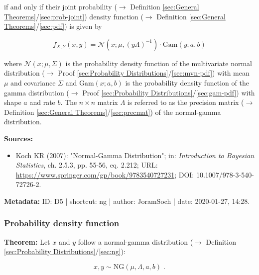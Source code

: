 \documentclass[a4paper,12pt,twoside]{book}
\begin{document}
if and only if their joint probability ($\rightarrow$ Definition \ref{sec:General Theorems}/\ref{sec:prob-joint}) density function ($\rightarrow$ Definition \ref{sec:General Theorems}/\ref{sec:pdf}) is given by

\begin{equation} \label{eq:ng-ng-pdf}
f_{X,Y}(x,y) = \mathcal{N}(x; \mu, (y \Lambda)^{-1}) \cdot \mathrm{Gam}(y; a, b)
\end{equation}

where $\mathcal{N}(x; \mu, \Sigma)$ is the probability density function of the multivariate normal distribution ($\rightarrow$ Proof \ref{sec:Probability Distributions}/\ref{sec:mvn-pdf}) with mean $\mu$ and covariance $\Sigma$ and $\mathrm{Gam}(x; a, b)$ is the probability density function of the gamma distribution ($\rightarrow$ Proof \ref{sec:Probability Distributions}/\ref{sec:gam-pdf}) with shape $a$ and rate $b$. The $n \times n$ matrix $\Lambda$ is referred to as the precision matrix ($\rightarrow$ Definition \ref{sec:General Theorems}/\ref{sec:precmat}) of the normal-gamma distribution.


\vspace{1em}
\textbf{Sources:}
\begin{itemize}
\item Koch KR (2007): "Normal-Gamma Distribution"; in: \textit{Introduction to Bayesian Statistics}, ch. 2.5.3, pp. 55-56, eq. 2.212; URL: \url{https://www.springer.com/gp/book/9783540727231}; DOI: 10.1007/978-3-540-72726-2.
\end{itemize}


\vspace{1em}
\textbf{Metadata:} ID: D5 | shortcut: ng | author: JoramSoch | date: 2020-01-27, 14:28.
\vspace{1em}



\subsubsection[\textbf{Probability density function}]{Probability density function} \label{sec:ng-pdf}
\setcounter{equation}{0}

\textbf{Theorem:} Let $x$ and $y$ follow a normal-gamma distribution ($\rightarrow$ Definition \ref{sec:Probability Distributions}/\ref{sec:ng}):

\begin{equation} \label{eq:ng-pdf-ng}
x,y \sim \mathrm{NG}(\mu, \Lambda, a, b) \; .
\end{equation}
\end{document}
